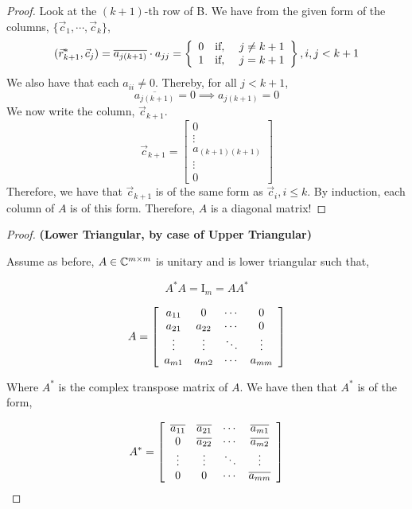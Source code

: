 \documentclass{article}
\begin{document}
\begin{enumerate}
\begin{proof}
Look at the $(k+1)$-th row of B. We have from the given form of the columns, $\{\vec{c}_1, \cdots, \vec{c}_k\}$, 
\[
    (\vec{r}_{k+1}^*, \vec{c}_j) = \overline{a_{j(k+1)}}\cdot a_{jj} = \left\{\begin{array}{c c c}
                                                                0 & \text{if, } & j \neq k+1\\
                                                                1 & \text{if, } & j = k+1
                                                            \end{array}\right\}, i, j < k+1
\]
We also have that each $a_{ii} \neq 0$. Thereby, for all $j < k+1$, 
\[\overline{a_{j(k+1)}} = 0 \implies a_{j(k+1)} = 0\]We now write the column, $\vec{c}_{k+1}$. 
\[  
    \vec{c}_{k+1} = \left[\begin{array}{c}
                    0 \\
                    \vdots \\
                    a_{(k+1)(k+1)} \\
                    \vdots \\
                    0
                    \end{array}\right]
\]
Therefore, we have that $\vec{c}_{k+1}$ is of the same form as $\vec{c}_{i}, i \le k$. By induction, each column of $A$ is of this form. Therefore, $A$ is a diagonal matrix!


\end{proof}

\begin{proof}

\textbf{(Lower Triangular, by case of Upper Triangular)}

Assume as before,  $A \in \mathbb{C}^{m \times m}$ is unitary and is lower triangular such that,

\[ 
    A^*A = \mathrm{I}_m = AA^*
\]

\[
    A = \left[\begin{array}{c c c c}
        a_{11} & 0 & \cdots & 0 \\
        a_{21} & a_{22} & \cdots & 0 \\
        \vdots & \vdots & \ddots & \vdots \\
        a_{m1} & a_{m2} & \cdots  & a_{mm}
        \end{array}\right]
\] 

Where $A^*$ is the complex transpose matrix of $A$. We have then that $A^*$ is of the form, 

\[
    A^* = \left[\begin{array}{c c c c}
        \overline{a_{11}} & \overline{a_{21}} & \cdots & \overline{a_{m1}} \\
        0 & \overline{a_{22}} & \cdots & \overline{a_{m2}} \\
        \vdots & \vdots & \ddots & \vdots \\
        0 & 0 & \cdots  & \overline{a_{mm}}
        \end{array}\right]
\] 


\end{proof}
\end{enumerate}
\end{document}

